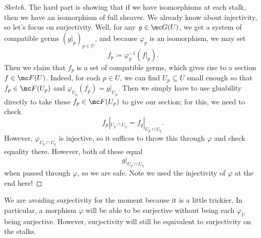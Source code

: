 \documentclass[../notes.tex]{subfiles}
\begin{document}
\begin{proof}[Sketch]
	The hard part is showing that if we have isomorphisms at each stalk, then we have an isomorphism of full sheaves. We already know about injectivity, so let's focus on surjectivity. Well, for any $g\in\mc G(U)$, we get a system of compatible germs $(g|_p)_{p\in U}$, and because $\varphi_p$ is an isomorphism, we may set
	\[f_p\coloneqq\varphi_p^{-1}(f|_p).\]
	Then we claim that $f_p$ is a set of compatible germs, which gives rise to a section $f\in\mc F(U)$. Indeed, for each $p\in U$, we can find $U_p\subseteq U$ small enough so that $f_p\in\mc F(U_p)$ and $\varphi_{U_p}(f_p)=g|_{U_p}$. Then we simply have to use gluability directly to take these $f_p\in\mc F(U_p)$ to give our section; for this, we need to check
	\[f_p|_{U_p\cap U_q}=f_q|_{U_p\cap U_q}.\]
	However, $\varphi_{U_p\cap U_q}$ is injective, so it suffices to throw this through $\varphi$ and check equality there. However, both of these equal
	\[g|_{U_p\cap U_q}\]
	when passed through $\varphi$, so we are safe. Note we used the injectivity of $\varphi$ at the end here!
\end{proof}
\begin{remark}
	We are avoiding surjectivity for the moment because it is a little trickier. In particular, a morphism $\varphi$ will be able to be surjective without being each $\varphi_U$ being surjective. However, surjectivity will still be equivalent to surjectivity on the stalks.
\end{remark}
\end{document}

